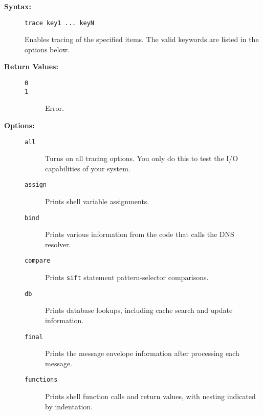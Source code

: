 \begin{description}
\item[{\bf Syntax:}] \mbox{}

{\tt trace key1 ... keyN}

Enables tracing of the specified items. The valid keywords 
are listed in the options below. 

\item[{\bf Return Values:}] \mbox{}

\begin{description}
\item[{\tt 0}] \mbox{}



\item[{\tt 1}] \mbox{}

Error.

\end{description}


\item[{\bf Options:}] \mbox{}

\begin{description}
\item[{\tt all}] \mbox{}

Turns on all tracing options. You only 
do this to test the I/O capabilities of your system. 

\item[{\tt assign}] \mbox{}

Prints shell variable assignments. 

\item[{\tt bind}] \mbox{}

Prints various information from the 
code that calls the DNS resolver. 

\item[{\tt compare}] \mbox{}

Prints {\tt sift} statement 
pattern-selector comparisons. 

\item[{\tt db}] \mbox{}

Prints database lookups, including cache 
search and update information. 

\item[{\tt final}] \mbox{}

Prints the message envelope information 
after processing each message. 

\item[{\tt functions}] \mbox{}

Prints shell function calls and 
return values, with nesting indicated by indentation. 


\end{description}
\end{description}

